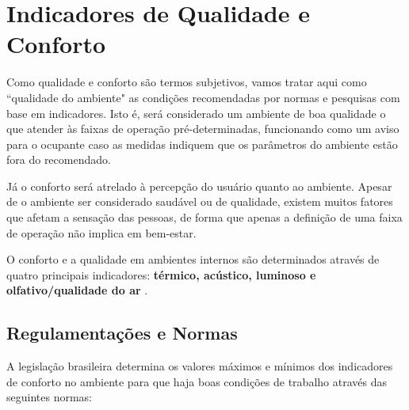 \documentclass[../monografia.tex]{subfiles}
\begin{document}

\section{Indicadores de Qualidade e Conforto} \label{arte-indicadores}


Como qualidade e conforto são termos subjetivos, vamos tratar aqui como ``qualidade do ambiente" as condições recomendadas por normas e pesquisas com base em indicadores. Isto é, será considerado um ambiente de boa qualidade o que atender às faixas de operação pré-determinadas, funcionando como um aviso para o ocupante caso as medidas indiquem que os parâmetros do ambiente estão fora do recomendado. 

Já o conforto será atrelado à percepção do usuário quanto ao ambiente. Apesar de o ambiente ser considerado saudável ou de qualidade, existem muitos fatores que afetam a sensação das pessoas, de forma que apenas a definição de uma faixa de operação não implica em bem-estar. 

O conforto e a qualidade em ambientes internos são determinados através de quatro principais indicadores: \textbf{térmico, acústico, luminoso e olfativo/qualidade do ar} \cite{ComfortBox}. 

\subsection{Regulamentações e Normas} %

A legislação brasileira determina os valores máximos e mínimos dos indicadores de conforto no ambiente para que haja boas condições de trabalho através das seguintes normas:
\end{document}
